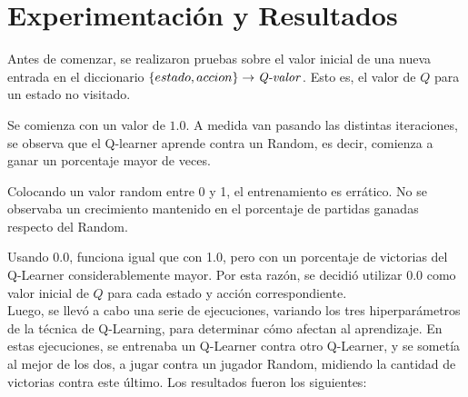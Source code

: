 \section{Experimentación y Resultados}
Antes de comenzar, se realizaron pruebas sobre el valor inicial de una nueva entrada en el diccionario $\{estado, accion\} \rightarrow \text{\emph{Q-valor}}$. Esto es, el valor de $Q$ para un estado no visitado.

Se comienza con un valor de $1.0$. A medida van pasando las distintas iteraciones, se observa que el Q-learner aprende contra un Random, es decir, comienza a ganar un porcentaje mayor de veces.

Colocando un valor random entre 0 y 1, el entrenamiento es errático. No se observaba un crecimiento mantenido en el porcentaje de partidas ganadas respecto del Random.

Usando 0.0, funciona igual que con 1.0, pero con un porcentaje de victorias del Q-Learner considerablemente mayor.
Por esta raz\'on, se decidi\'o utilizar $0.0$ como valor inicial de $Q$ para cada estado y acci\'on correspondiente.\\

Luego, se llev\'o a cabo una serie de ejecuciones, variando los tres hiperpar\'ametros de la t\'ecnica de Q-Learning, para determinar c\'omo afectan al aprendizaje.
En estas ejecuciones, se entrenaba un Q-Learner contra otro Q-Learner, y se somet\'ia al mejor de los dos, a jugar contra un jugador Random, midiendo la cantidad de victorias contra este \'ultimo. Los resultados fueron los siguientes:

